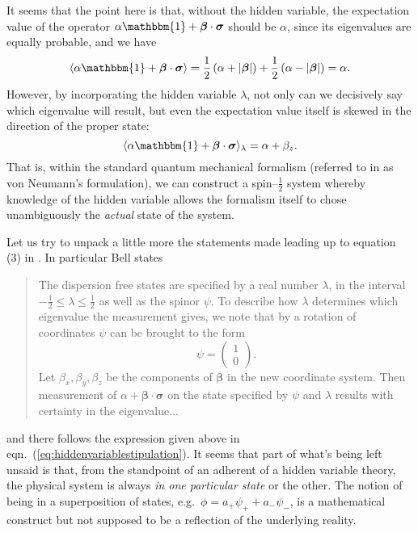 \documentclass[12pt]{article}
\begin{document}
It seems that the point here is that, without the hidden variable, the
expectation value of the operator $\alpha \mathbbm{1} + \bm{\beta}
\cdot \bm{\sigma}$ should be $\alpha$, since its eigenvalues are
equally probable, and we have 
\begin{displaymath}
  \langle \alpha \mathbbm{1} + \bm{\beta} \cdot \bm{\sigma} \rangle
  = \frac{1}{2} \left( \alpha + |\bm{\beta}| \right) + \frac{1}{2} \left( \alpha - |\bm{\beta}| \right)
  = \alpha.
\end{displaymath}
However, by incorporating the hidden variable $\lambda$, not only can we decisively say which eigenvalue will result, but even the expectation value itself is skewed in the direction of the proper state:
\begin{displaymath}
  \langle \alpha \mathbbm{1} + \bm{\beta} \cdot \bm{\sigma} \rangle_{\lambda} = \alpha + \beta_z.
\end{displaymath}
That is, within the standard quantum mechanical formalism (referred to in \cite{Bell1966} as von Neumann's formulation), we can construct a spin--$\frac{1}{2}$ system whereby knowledge of the hidden variable allows the formalism itself to chose unambiguously the \emph{actual} state of the system.

Let us try to unpack a little more the statements made leading up to equation (3) in \cite[p.448]{Bell1966}. In particular Bell states
\begin{quotation}
  \begin{small}
    The dispersion free states are specified by a real number $\lambda$, in the interval $-\frac{1}{2} \le \lambda \le \frac{1}{2}$ as well as the spinor $\psi$. To describe how $\lambda$ determines which eigenvalue the measurement gives, we note that by a rotation of coordinates $\psi$ can be brought to the form
    \begin{displaymath}
      \psi =
      \begin{pmatrix}
        1 \\
        0
      \end{pmatrix}.
    \end{displaymath}
    Let $\beta_x, \beta_y, \beta_z$ be the components of $\bm{\beta}$ in the new coordinate system. Then measurement of $\alpha + \bm{\beta} \cdot \bm{\sigma}$ on the state specified by $\psi$ and $\lambda$ results with certainty in the eigenvalue...
  \end{small}
\end{quotation}
and there follows the expression given above in eqn.~(\ref{eq:hiddenvariablestipulation}). It seems that part of what's being left unsaid is that, from the standpoint of an adherent of a hidden variable theory, the physical system is always \emph{in one particular state} or the other. The notion of being in a superposition of states, e.g.\ $\phi = a_{+} \psi_{+} + a_{-} \psi_{-}$, is a mathematical construct but not supposed to be a reflection of the underlying reality.
\end{document}

